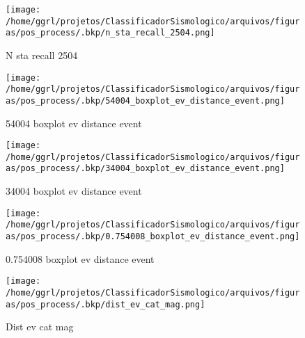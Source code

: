                     \begin{figure}[H]
                        \centering
                        \texttt{[image: /home/ggrl/projetos/ClassificadorSismologico/arquivos/figuras/pos\_process/.bkp/n\_sta\_recall\_2504.png]}
                        \caption{N sta recall 2504}
                        \label{fig:n_sta_recall_2504}
                    \end{figure}
                

                    \begin{figure}[H]
                        \centering
                        \texttt{[image: /home/ggrl/projetos/ClassificadorSismologico/arquivos/figuras/pos\_process/.bkp/54004\_boxplot\_ev\_distance\_event.png]}
                        \caption{54004 boxplot ev distance event}
                        \label{fig:54004_boxplot_ev_distance_event}
                    \end{figure}
                

                    \begin{figure}[H]
                        \centering
                        \texttt{[image: /home/ggrl/projetos/ClassificadorSismologico/arquivos/figuras/pos\_process/.bkp/34004\_boxplot\_ev\_distance\_event.png]}
                        \caption{34004 boxplot ev distance event}
                        \label{fig:34004_boxplot_ev_distance_event}
                    \end{figure}
                

                    \begin{figure}[H]
                        \centering
                        \texttt{[image: /home/ggrl/projetos/ClassificadorSismologico/arquivos/figuras/pos\_process/.bkp/0.754008\_boxplot\_ev\_distance\_event.png]}
                        \caption{0.754008 boxplot ev distance event}
                        \label{fig:0.754008_boxplot_ev_distance_event}
                    \end{figure}
                

                    \begin{figure}[H]
                        \centering
                        \texttt{[image: /home/ggrl/projetos/ClassificadorSismologico/arquivos/figuras/pos\_process/.bkp/dist\_ev\_cat\_mag.png]}
                        \caption{Dist ev cat mag}
                        \label{fig:dist_ev_cat_mag}
                    \end{figure}
                

